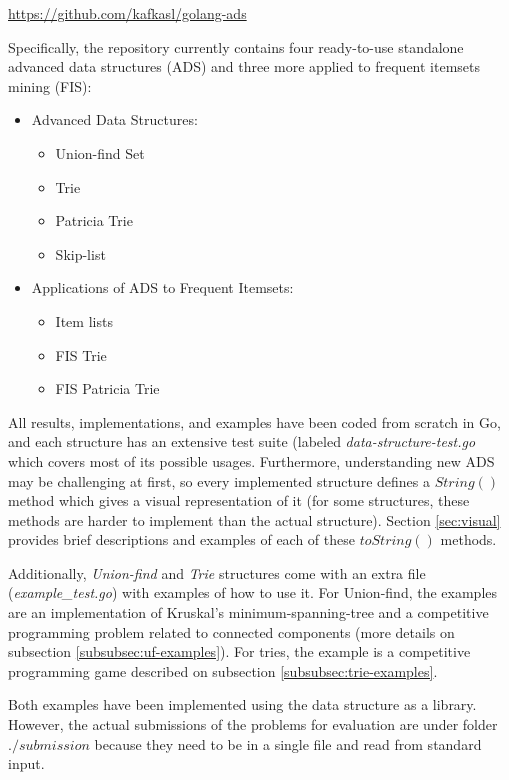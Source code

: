\documentclass[a4paper,10pt,table,xcdraw]{article}
\begin{document}
\url{https://github.com/kafkasl/golang-ads}

Specifically, the repository currently contains four ready-to-use standalone advanced data structures (ADS) and three more applied to frequent itemsets mining (FIS): 

\begin{itemize}
\item Advanced Data Structures:
  \begin{itemize}
  \item Union-find Set
  \item Trie
  \item Patricia Trie
  \item Skip-list
\end{itemize}
\item Applications of ADS to Frequent Itemsets:
\begin{itemize}
  \item Item lists
  \item FIS Trie
  \item FIS Patricia Trie
\end{itemize}
\end{itemize}

All results, implementations, and examples have been coded from scratch in Go, and each structure has an extensive test suite (labeled \textit{data-structure-test.go} which covers most of its possible usages. Furthermore, understanding new ADS may be challenging at first, so every implemented structure defines a $String()$ method which gives a visual representation of it (for some structures, these methods are harder to implement than the actual structure). Section \ref{sec:visual} provides brief descriptions and examples of each of these $toString()$ methods.

Additionally, \textit{Union-find} and \textit{Trie} structures come with an extra file (\textit{example\_test.go}) with examples of how to use it. For Union-find, the examples are an implementation of Kruskal's \cite{Kruskal1956} minimum-spanning-tree and a competitive programming problem related to connected components (more details on subsection \ref{subsubsec:uf-examples}). For tries, the example is a competitive programming game described on subsection \ref{subsubsec:trie-examples}. 

Both examples have been implemented using the data structure as a library. However, the actual submissions of the problems for evaluation are under folder $./submission$ because they need to be in a single file and read from standard input.
\end{document}
